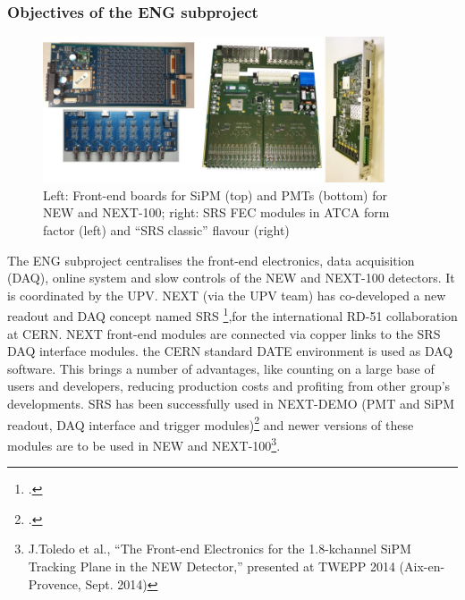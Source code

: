 %
%

\subsubsection*{Objectives of the ENG subproject}

\begin{figure}[h!]
\begin{center}
\includegraphics[width=0.9\textwidth]{img/Electronics.jpg}
\end{center}
\caption{\label{Fig:FEE} Left: Front-end boards for SiPM (top) and PMTs (bottom) for NEW and NEXT-100; right: SRS FEC modules in ATCA form factor (left) and “SRS classic” flavour (right) }
\end{figure}

The ENG subproject centralises the front-end electronics, data acquisition (DAQ), online system and slow controls of the NEW and NEXT-100 detectors. It is coordinated by the UPV.
NEXT (via the UPV team) has co-developed a new readout and DAQ concept named SRS \footcite{Toledo2011,SRS2013},for the international RD-51 collaboration at CERN. NEXT front-end modules are connected via copper links to the SRS DAQ interface modules. the CERN standard DATE environment is used as DAQ software. This brings a number of advantages, like counting on a large base of users and developers, reducing production costs and profiting from other group’s developments. SRS has been successfully used in NEXT-DEMO (PMT and SiPM readout, DAQ interface and trigger modules)\footcite{Gil2012,Herrero2012,Esteve2012} and newer versions of these modules are to be used in NEW and NEXT-100\footnote{J.Toledo et al., “The Front-end Electronics for the 1.8-kchannel SiPM Tracking Plane in the NEW Detector,”  presented at TWEPP 2014 (Aix-en-Provence, Sept. 2014)}.


